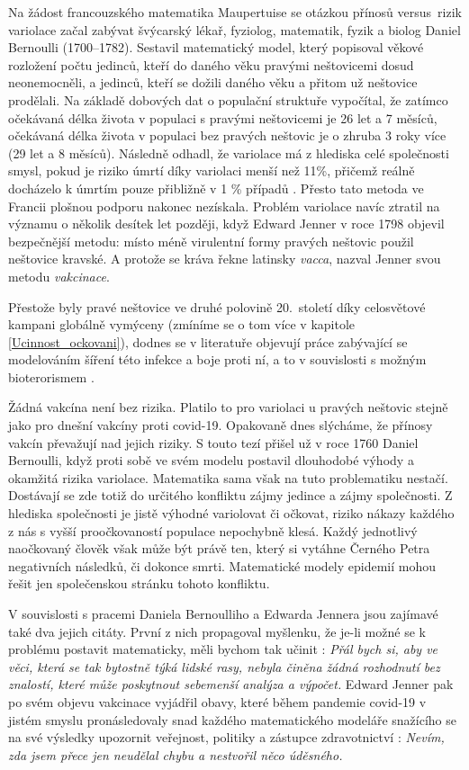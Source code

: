 Na žádost francouzského matematika Maupertuise se otázkou přínosů versus\ rizik variolace začal zabývat švýcarský lékař, fyziolog, matematik, fyzik a biolog Daniel Bernoulli (1700--1782). Sestavil matematický model, který popisoval věkové rozložení počtu jedinců, kteří do daného věku pravými neštovicemi dosud neonemocněli, a jedinců, kteří se dožili daného věku a přitom už neštovice prodělali. Na základě dobových dat o populační struktuře vypočítal, že zatímco očekávaná délka života v populaci s pravými neštovicemi je 26 let a 7 měsíců, očekávaná délka života v populaci bez pravých neštovic je o zhruba 3 roky více (29 let a 8 měsíců). Následně odhadl, že variolace má z hlediska celé společnosti smysl, pokud je riziko úmrtí díky variolaci menší než 11\%, přičemž reálně docházelo k úmrtím pouze přibližně v 1 \% případů \cite{Bacaer2011}. Přesto tato metoda ve Francii plošnou podporu nakonec nezískala. Problém variolace navíc ztratil na významu o několik desítek let později, když Edward Jenner v roce 1798 objevil bezpečnější metodu: místo méně virulentní formy pravých neštovic použil neštovice kravské. A protože se kráva řekne latinsky \emph{vacca}, nazval Jenner svou metodu \emph{vakcinace}. 

Přestože byly pravé neštovice ve druhé polovině 20.\ století díky celosvětové kampani globálně vymýceny (zmíníme se o tom více v kapitole \ref{Ucinnost_ockovani}), dodnes se v literatuře objevují práce zabývající se modelováním šíření této infekce a boje proti ní, a to v souvislosti s možným bioterorismem \cite{Bozzette_etal2003,Longini_etal2007}.

Žádná vakcína není bez rizika. Platilo to pro variolaci u pravých neštovic stejně jako pro dnešní vakcíny proti covid-19. Opakovaně dnes slýcháme, že přínosy vakcín převažují nad jejich riziky. S touto tezí přišel už v roce 1760 Daniel Bernoulli, když proti sobě ve svém modelu postavil dlouhodobé výhody a okamžitá rizika variolace. Matematika sama však na tuto problematiku nestačí. Dostávají se zde totiž do určitého konfliktu zájmy jedince a zájmy společnosti. Z hlediska společnosti je jistě výhodné variolovat či očkovat, riziko nákazy každého z nás s vyšší proočkovaností populace nepochybně klesá. Každý jednotlivý naočkovaný člověk však může být právě ten, který si vytáhne Černého Petra negativních následků, či dokonce smrti. Matematické modely epidemií mohou řešit jen společenskou stránku tohoto konfliktu.

V souvislosti s pracemi Daniela Bernoulliho a Edwarda Jennera jsou zajímavé také dva jejich citáty. První z nich propagoval myšlenku, že je-li možné se k problému postavit matematicky, měli bychom tak učinit \cite{Bacaer2011}: \emph{Přál bych si, aby ve věci, která se tak bytostně týká lidské rasy, nebyla činěna žádná rozhodnutí bez znalostí, které může poskytnout sebemenší analýza a výpočet.} Edward Jenner pak po svém objevu vakcinace vyjádřil obavy, které během pandemie covid-19 v jistém smyslu pronásledovaly snad každého matematického modeláře snažícího se na své výsledky upozornit veřejnost, politiky a zástupce zdravotnictví \cite{JennerCitat}: \emph{Nevím, zda jsem přece jen neudělal chybu a nestvořil něco úděsného.}

